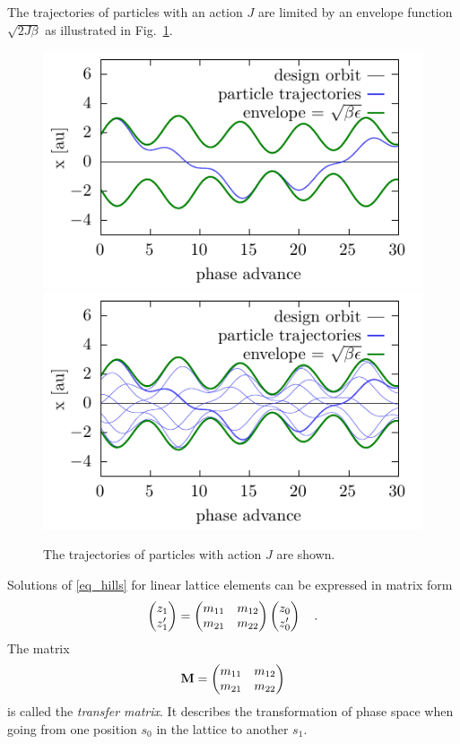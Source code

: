 The trajectories of particles with an action $J$ are limited by an envelope function $\sqrt{2J\beta}$
as illustrated in Fig.~\ref{fig_part_traj}.
%
\begin{figure}[h]
    \centering
    \includegraphics[width=.49\linewidth]{particle_traj_beta_1}
    \hfill
    \includegraphics[width=.49\linewidth]{particle_traj_beta_many_wb} 
    \caption{The trajectories of particles with action $J$ are shown. }
    \label{fig_part_traj}
\end{figure}
%
Solutions of \eqref{eq_hills} for linear lattice elements can be expressed in matrix form
%
\begin{equation}
    \begin{pmatrix}
        z_1\\
        z_1'
    \end{pmatrix}
    =
    \begin{pmatrix}
        m_{11} & m_{12} \\
        m_{21} & m_{22}
    \end{pmatrix}
    \begin{pmatrix}
        z_0\\
        z_0'
    \end{pmatrix}
    \quad .
    \label{eq_matrix_element}
\end{equation}
%
The matrix 
%
\begin{equation}
    \mathbf{M} = 
    \begin{pmatrix}
        m_{11} & m_{12} \\
        m_{21} & m_{22}
    \end{pmatrix}
    \label{eq_trmat}
\end{equation}
%
is called the \emph{transfer matrix}. It describes the transformation
of phase space when going from one position $s_0$ in the lattice to another $s_1$.


